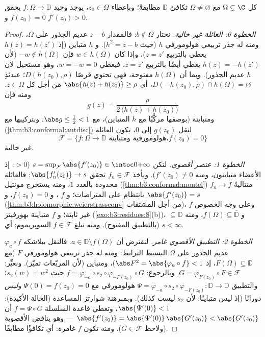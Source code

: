 \begin{theorem}
\label{thm:b3:conformal:rmt}
كل   $\Omega \subsetneq \C$ مع $\Omega
\neq \varnothing$ تكافئ
$\mathbb D$ مطابقةً؛ وبإعطاء $z_0 \in \Omega$، يوجد 
وحيد $f \colon
\Omega \to \mathbb D$ يحقق $f(z_0) = 0$ و $f'(z_0) >
0$.
\end{theorem}

\begin{proof}
\emph{الخطوة 0: العائلة غير خالية.} نختار $b \notin \Omega$: فالمقدار
$z - b$ عديم الجذور على $\Omega$، ومنه له جذر تربيعي هولومورفي
$h$ (حيث $h^2 = z - b$). و $h$ متباين (إذ $h(z) =
h(z')$ يعطي بالتربيع
$z = z'$)، وإذا كان $w \in h(\Omega)$ فإن $-w
\notin h(\Omega)$ (لأن $h(z) = -h(z')$
يعطي أيضًا بالتربيع $z = z'$، فيعطي $w = -w = 0$، وهو مستحيل
لأن $h$ عديم الجذور). وبما أن $h(\Omega)$ مفتوحة، فهي تحتوي
قرصًا $D(h(z_0), \rho)$؛ عندئذٍ $D(-h(z_0), \rho) \cap h(\Omega) = \varnothing$، أي $\abs{h(z) + h(z_0)} \geq \rho$ من أجل كل $z \in \Omega$.
ومنه فإن
\[
g(z) = \frac{\rho}{2\,\bigl(h(z) + h(z_0)\bigr)}
\]
 ومتباينة (بوصفها  مركَّبًا مع $h$
المتباين)، مع $\abs g \leq \frac12 < 1$. وبتركيبها مع  (\cref{thm:b3:conformal:autdisc})
لنقل $g(z_0)$ إلى $0$، تكون العائلة
\[
\mathcal F = \{f \colon \Omega \to \mathbb D \text{ هولومورفية ومتباينة،} f(z_0) = 0\}
\]
غير خالية.

\emph{الخطوة 1: عنصر أقصوي.} لتكن $s =
\sup_{\mathcal F}\abs{f'(z_0)} \in \intoc0{+\infty}$ ($> 0$: إذ الأعضاء
متباينون، ومنه $f'(z_0) \neq 0$). ونأخذ $f_n \in
\mathcal F$ تحقق $\abs{f_n'(z_0)} \to s$:
فالعائلة محدودة بالعدد $1$، ومنه يستخرج مونتيل (\cref{thm:b3:conformal:montel})
متتاليةً $f_n \to f$ بانتظام على المتراصات؛ و $f$ ،
و $f(z_0) = 0$، و $\abs{f'(z_0)} = s$ (\cref{thm:b3:holomorphic:weierstrassconv} من أجل المشتقات)، وعلى
وجه الخصوص $f$ غير ثابتة؛ و $f$ متباينة بهورفيتز
(\cref{exo:b3:residues:8}(b))، و $f(\Omega) \subseteq \bar{\mathbb D}$، ومنه $\subseteq
\mathbb D$ (بالتطبيق المفتوح).
ومنه تبلغ $f \in \mathcal F$ السوپريموم: أي $s < \infty$.

\emph{الخطوة 2: التطبيق الأقصوي غامر.} لنفترض أن $a \in
\mathbb D\setminus f(\Omega)$.
فالنقل ببلاشكه $\varphi_a\circ f$ عديم الجذور على $\Omega$ البسيط
الترابط: ومنه له جذر تربيعي هولومورفي $F$ (مع $F(\Omega) \subseteq \mathbb D$، إذ
$\abs F^2 =
\abs{\varphi_a\circ f} < 1$)، ومتباين (لأن المربّعات تميّز). ونعيِّر: $G = \varphi_{F(z_0)}\circ F \in
\mathcal F$.
وبالرجوع: $f = \varphi_{-a}\circ s_2 \circ
\varphi_{-F(z_0)}\circ G$ حيث $s_2(w) = w^2$؛ والتطبيق $\Psi
= \varphi_{-a}\circ s_2\circ\varphi_{-F(z_0)} \colon \mathbb D
\to \mathbb D$
هولومورفي مع $\Psi(0) = f(z_0) = 0$ و\emph{ليس} دورانًا (إذ ليس متباينًا: لأن
$s_2$ ليست كذلك). وبمبرهنة شوارتز المساعدة (الحالة الأكيدة):
$\abs{\Psi'(0)} < 1$، وتعطي قاعدة السلسلة $f = \Psi\circ G$ أن $\abs{f'(z_0)} =
\abs{\Psi'(0)}\,\abs{G'(z_0)} < \abs{G'(z_0)}$ --- وهو يناقض
الأقصوية (ولاحظ $G \in \mathcal F$). ومنه تكون $f$ غامرة: أي تكافؤًا
مطابقًا.


\end{proof}
